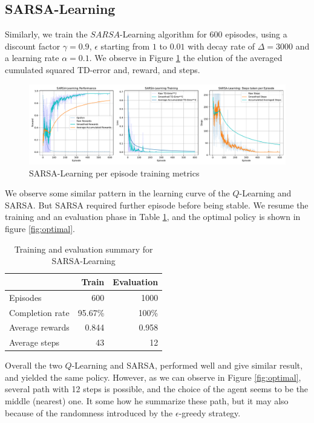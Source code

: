 \subsection{SARSA-Learning}
Similarly, we train the $SARSA$-Learning algorithm for $600$ episodes, using a discount factor $\gamma=0.9$, $\epsilon$ starting from $1$ to $0.01$ with decay rate of $\Delta=3000$ and a learning rate $\alpha=0.1$. We observe in Figure \ref{fig:sarsalog} the elution of the averaged cumulated squared TD-error and, reward, and steps.
\begin{figure}[H]
	\centering
	\includegraphics[width=\linewidth]{figures/SARSALearning_episode.pdf}
	\caption{SARSA-Learning per episode training metrics}
	\label{fig:sarsalog}
\end{figure}
We observe some similar pattern in the learning curve of the $Q$-Learning and SARSA. But SARSA required further episode before being stable.  We resume the training and an evaluation phase in Table \ref{tab:sarsa}, and the optimal policy is shown in figure \ref{fig:optimal}.
\begin{table}
	\centering
	\begin{tabular}{@{}lrr@{}}
		\cmidrule(l){2-3}
		& Train & Evaluation \\ \midrule
		Episodes        &  600      &  1000          \\
		Completion rate &   95.67\%    &  100\%           \\
		Average rewards &   0.844    &    0.958        \\
		Average steps   &    43   &     12       \\ \bottomrule
	\end{tabular}
		\caption{Training and evaluation summary for {SARSA-Learning}}
	\label{tab:sarsa}
\end{table}

Overall the two $Q$-Learning and SARSA, performed well and give similar result, and yielded the same policy. However, as we can observe in Figure \ref{fig:optimal}, several path with 12 steps is possible, and the choice of the agent seems to be the middle (nearest) one. It some how he summarize these path, but it may also because of the randomness introduced by the $\epsilon$-greedy strategy.




